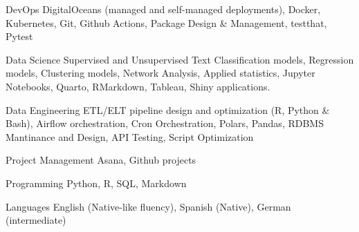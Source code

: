 

\begin{cvskills}

  \cvskill
    {DevOps} %
    {DigitalOceans (managed and self-managed deployments), Docker, Kubernetes, Git, Github Actions, Package Design \& Management, testthat, Pytest} %

  \cvskill
    {Data Science} %
    {Supervised and Unsupervised Text Classification models, Regression models, Clustering models, Network Analysis, Applied statistics, Jupyter Notebooks, Quarto, RMarkdown, Tableau, Shiny applications.} %

  \cvskill
    {Data Engineering} %
    {ETL/ELT pipeline design and optimization (R, Python \& Bash), Airflow orchestration, Cron Orchestration, Polars, Pandas, RDBMS Mantinance and Design, API Testing, Script Optimization} %

  \cvskill
    {Project Management} %
    {Asana, Github projects} %

  \cvskill
    {Programming} %
    {Python, R, SQL, Markdown} %

  \cvskill
    {Languages} %
    {English (Native-like fluency), Spanish (Native), German (intermediate)} %

\end{cvskills}

